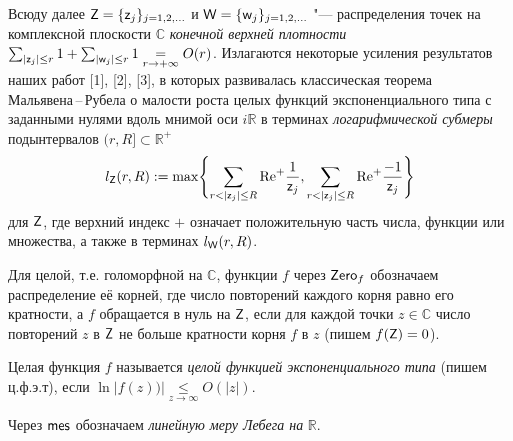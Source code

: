 
\vzmscaption



Всюду далее $ {\sf Z}= \{{\sf z}_j\}_{j=1,2, \dots}$ и ${\sf W}= \{{\sf w}_{j}\}_{j=1,2, \dots}$ "--- распределения точек на комплексной плоскости $ \mathbb C$ {\it конечной верхней плотности\/} $\sum_{|{\sf z}_j|\leq r}1+\sum_{|{\sf w}_j|\leq r}1\underset{r\to +\infty}{=}O(r)$.
Излагаются некоторые усиления результатов наших работ [1], [2], [3], в которых развивалась классическая теорема Мальявена\,--\,Рубела о малости роста целых функций экспоненциального типа с заданными нулями вдоль мнимой оси $i\mathbb R$ в терминах
{\it логарифмической субмеры} подынтервалов $(r,R]\subset \mathbb R^+$
\begin{equation*}%
l_{\sf Z} (r,R):=
\max \Biggl\{\sum_{r< |{\sf z}_j|\leq R} {\rm Re}^+ \frac{1}{{\sf z}_j},
\sum_{r < |{\sf z}_j|\leq R} {\rm Re}^+ \frac{-1}{{\sf z}_j}\Biggr\}
\end{equation*}
для ${\sf Z}$, где верхний индекс $+$ означает положительную часть числа, функции или множества, а также в терминах $l_{\sf W} (r,R)$.

Для целой, т.е. голоморфной на $\mathbb C$, функции $f$ через ${\sf Zero}_f$ обозначаем распределение её корней, где число повторений каждого корня равно его кратности, а $f$ обращается в нуль на ${\sf Z}$, если для каждой точки $z\in \mathbb C$ число повторений $z$ в ${\sf Z}$ не больше кратности корня $f$ в $z$ (пишем $f({\sf Z})=0$).

Целая функция $f$ называется {\it целой функцией экспоненциального типа} (пишем ц.ф.э.т), если $\ln |f(z))|\underset{z\to \infty}{\leq} O(|z|)$.

Через $\sf mes$ обозначаем {\it линейную меру Лебега на\/} $\mathbb R$.
